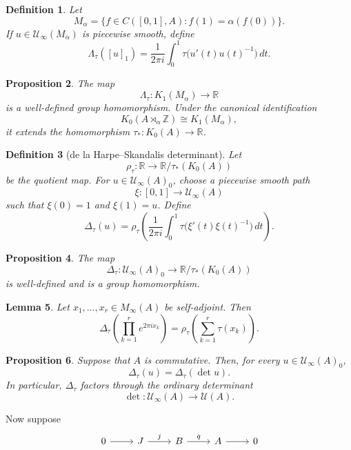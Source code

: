 \documentclass{book}
\newtheorem{definition}{Definition}[section]
\newtheorem{lemma}[definition]{Lemma}
\newtheorem{proposition}[definition]{Proposition}
\begin{document}
\begin{definition}\label{def:LambdaTrace}
  Let
  \[
    M_\alpha
    =
    \{f\in C([0,1],A):f(1)=\alpha(f(0))\}.
  \]
  If \(u\in\mathcal U_\infty(M_\alpha)\) is piecewise smooth, define
  \[
    \Lambda_\tau([u]_1)
    =
    \frac{1}{2\pi i}
    \int_0^1
    \tau\bigl(u'(t)u(t)^{-1}\bigr)\,dt.
  \]
\end{definition}
\begin{proposition}\label{prop:LambdaTrace}
  The map
  \[
    \Lambda_\tau:K_1(M_\alpha)\longrightarrow\mathbb{R}
  \]
  is a well-defined group homomorphism. Under the canonical
  identification
  \[
    K_0(A\rtimes_\alpha\mathbb{Z})
    \cong K_1(M_\alpha),
  \]
  it extends the homomorphism
  \(\tau_*:K_0(A)\to\mathbb{R}\).
\end{proposition}
\begin{definition}[de la Harpe--Skandalis determinant]
  \label{def:deLaHarpeSkandalis}
  Let
  \[
    \rho_\tau:
    \mathbb{R}\longrightarrow
    \mathbb{R}/\tau_*(K_0(A))
  \]
  be the quotient map. For \(u\in\mathcal U_\infty(A)_0\), choose a
  piecewise smooth path
  \[
    \xi:[0,1]\longrightarrow\mathcal U_\infty(A)
  \]
  such that \(\xi(0)=1\) and \(\xi(1)=u\). Define
  \[
    \Delta_\tau(u)
    =
    \rho_\tau\left(
      \frac{1}{2\pi i}
      \int_0^1
      \tau\bigl(\xi'(t)\xi(t)^{-1}\bigr)\,dt
    \right).
  \]
\end{definition}
\begin{proposition}\label{prop:deLaHarpeWellDefined}
  The map
  \[
    \Delta_\tau:
    \mathcal U_\infty(A)_0
    \longrightarrow
    \mathbb{R}/\tau_*(K_0(A))
  \]
  is well-defined and is a group homomorphism.
\end{proposition}
\begin{lemma}\label{lemma:determinantExponentials}
  Let \(x_1,\ldots,x_r\in M_\infty(A)\) be self-adjoint. Then
  \[
    \Delta_\tau\left(
      \prod_{k=1}^r e^{2\pi i x_k}
    \right)
    =
    \rho_\tau\left(
      \sum_{k=1}^r\tau(x_k)
    \right).
  \]
\end{lemma}
\begin{proposition}\label{prop:determinantCommutative}
  Suppose that \(A\) is commutative. Then, for every
  \(u\in\mathcal U_\infty(A)_0\),
  \[
    \Delta_\tau(u)
    =
    \Delta_\tau(\det u).
  \]
  In particular, \(\Delta_\tau\) factors through the ordinary
  determinant
  \[
    \det:\mathcal U_\infty(A)\longrightarrow\mathcal U(A).
  \]
\end{proposition}
Now suppose 
\[
  \begin{tikzcd}
    0\arrow[r]&J\arrow[r,"j"]&B\arrow[r,"q"]&A\arrow[r]&0
  \end{tikzcd}
\]
\end{document}
